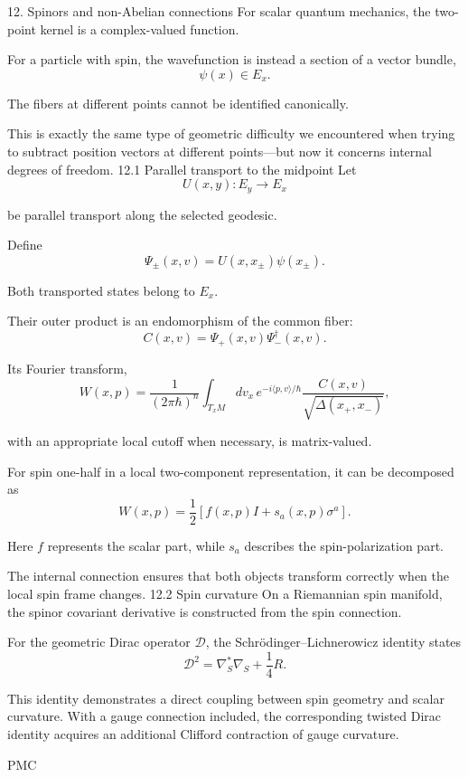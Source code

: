 12. Spinors and non-Abelian connections
For scalar quantum mechanics, the two-point kernel is a complex-valued function.

For a particle with spin, the wavefunction is instead a section of a vector bundle,
\[
\psi(x)\in E_x.
\]

The fibers at different points cannot be identified canonically.

This is exactly the same type of geometric difficulty we encountered when trying to subtract position vectors at different points—but now it concerns internal degrees of freedom.
12.1 Parallel transport to the midpoint
Let
\[
U(x,y):E_y\to E_x
\]

be parallel transport along the selected geodesic.

Define
\[
\Psi_\pm(x,v)=U(x,x_\pm)\psi(x_\pm).
\tag{107}
\]

Both transported states belong to \(E_x\).

Their outer product is an endomorphism of the common fiber:
\[
C(x,v)=
\Psi_+(x,v)\Psi_-^\dagger(x,v).
\tag{108}
\]

Its Fourier transform,
\[
\boxed{
W(x,p)=
\frac1{(2\pi\hbar)^n}
\int_{T_xM}dv_x\,
e^{-i\langle p,v\rangle/\hbar}
\frac{C(x,v)}
{\sqrt{\Delta(x_+,x_-)}},
}
\tag{109}
\]

with an appropriate local cutoff when necessary, is matrix-valued.

For spin one-half in a local two-component representation, it can be decomposed as
\[
W(x,p)=
\frac12\left[
f(x,p)I+s_a(x,p)\sigma^a
\right].
\tag{110}
\]

Here \(f\) represents the scalar part, while \(s_a\) describes the spin-polarization part.

The internal connection ensures that both objects transform correctly when the local spin frame changes.
12.2 Spin curvature
On a Riemannian spin manifold, the spinor covariant derivative is constructed from the spin connection.

For the geometric Dirac operator \(\mathcal D\), the Schrödinger–Lichnerowicz identity states
\[
\boxed{
\mathcal D^2=
\nabla_S^*\nabla_S+\frac14R.
}
\tag{111}
\]

This identity demonstrates a direct coupling between spin geometry and scalar curvature. With a gauge connection included, the corresponding twisted Dirac identity acquires an additional Clifford contraction of gauge curvature. 

PMC




